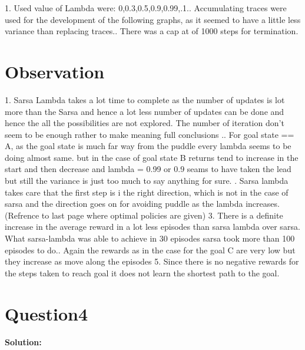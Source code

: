 \documentclass[12pt, letterpaper, twoside]{report}
\begin{document}
1. Used value of Lambda were: 0,0.3,0.5,0.9,0.99,.1.. Accumulating traces were used for the development of the following graphs, as it  seemed to have a little less variance than replacing traces.. There was a cap at of 1000 steps for termination.
\section*{Observation}
1. Sarsa Lambda takes a lot time to complete as the number of updates is lot more than the Sarsa and hence a lot less number of updates can be done and hence the all the possibilities are not explored. The number of iteration don't seem to be enough rather to make meaning full conclusions .. For goal state == A, as the goal state is much far way from the puddle every lambda seems to be doing almost same. but in the case of goal state B returns tend to increase in the start and then decrease and lambda = 0.99 or 0.9 seams to have taken the lead but still the variance is just too much to say anything for sure.  . Sarsa lambda takes care that the first step is i the right direction, which is not in the case of sarsa and the direction goes on for avoiding puddle as the lambda increases.(Refrence to last page where optimal policies are given)
3. There is a definite increase in the average reward in a lot less episodes than sarsa lambda over sarsa. What sarsa-lambda was able to achieve in 30 episodes sarsa took more than 100 episodes to do.. Again the rewards as in the case for the goal C are very low but they increase as move along the episodes
5. Since there is no negative rewards for the steps taken to reach goal it does not learn the shortest path to the goal.
\section*{Question4}
\textbf{Solution:} \par
\end{document}
